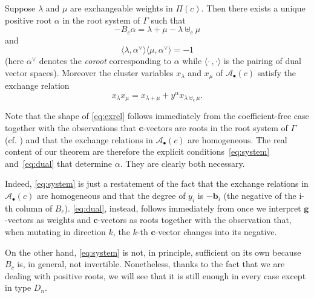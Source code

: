 \documentclass[pdftex]{sigma}
\numberwithin{equation}{section}
\numberwithin{theorem}{section}
\numberwithin{proposition}{section}
\numberwithin{lemma}{section}
\numberwithin{corollary}{section}
\numberwithin{definition}{section}
\numberwithin{example}{section}
\numberwithin{remark}{section}
\numberwithin{note}{section}
\newcommand{\cA}{\mathcal{A}}
\newcommand{\bg}{\mathbf{g}}
\newcommand{\bc}{\mathbf{c}}
\newcommand{\bb}{\mathbf{b}}
\begin{document}
  \begin{theorem}
    \label{thm:main}
    Suppose $\lambda$ and $\mu$ are exchangeable weights in $\Pi(c)$.
    Then there exists a unique  positive root  $\alpha$ in the root system of $\Gamma$ such that
    \begin{equation}
      \label{eq:system}
      -B_c\alpha = \lambda+\mu-\lambda\uplus_c\mu
    \end{equation}
    and
    \begin{equation}
      \label{eq:dual}
      \langle\lambda,\alpha^\vee\rangle
      \langle\mu,\alpha^\vee\rangle
      = -1
    \end{equation}
    (here $\alpha^\vee$ denotes the \emph{coroot} corresponding to $\alpha$ while $\langle\cdot\,,\cdot\rangle$ is the pairing of dual vector spaces).
    Moreover the cluster variables $x_\lambda$ and $x_\mu$ of $\cA_\bullet(c)$ satisfy the exchange relation
    \begin{equation}
      \label{eq:exrel}
      x_\lambda x_\mu = x_{\lambda+\mu} + y^\alpha x_{\lambda\uplus_c\mu}.
    \end{equation}
   \end{theorem}

  Note that the shape of \cref{eq:exrel} follows immediately from the coefficient-free case \cite[Proposition 5.2]{Ste13} together with the observations that $\bc$-vectors are roots in the root system of $\Gamma$ (cf. \cite{NS14})  and that the exchange relations in $\cA_\bullet(c)$ are homogeneous.
  The real content of our theorem are therefore the explicit conditions~\cref{eq:system} and~\cref{eq:dual} that determine $\alpha$.
  They are clearly both necessary.

  Indeed, \cref{eq:system} is just a restatement of the fact that the exchange relations in $\cA_\bullet(c)$ are homogeneous and that the degree of $y_i$ is $-\bb_i$ (the negative of the i-th column of $B_c$).
  \cref{eq:dual}, instead, follows immediately from \cite[Eq. (1.11)]{NZ12} once we interpret $\bg$-vectors as weights and $\bc$-vectors as roots together with the observation that, when mutating in direction $k$, the $k$-th $\bc$-vector changes into its negative.

  On the other hand, \cref{eq:system} is not, in principle, sufficient on its own because $B_c$ is, in general, not invertible.
  Nonetheless, thanks to the fact that we are dealing with positive roots, we will see that it is still enough in every case except in type $D_n$.
\end{document}
